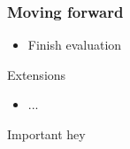 \documentclass{beamer}
\begin{document}
\begin{frame}[t]
    \frametitle{Moving forward}
    \begin{itemize}
        \item Finish evaluation
    \end{itemize}


    \begin{block}{Extensions}
        \begin{itemize}
            \item ...
        \end{itemize}
    \end{block}

    \begin{alertblock}{Important}
        hey
    \end{alertblock}
\end{frame}
\end{document}

